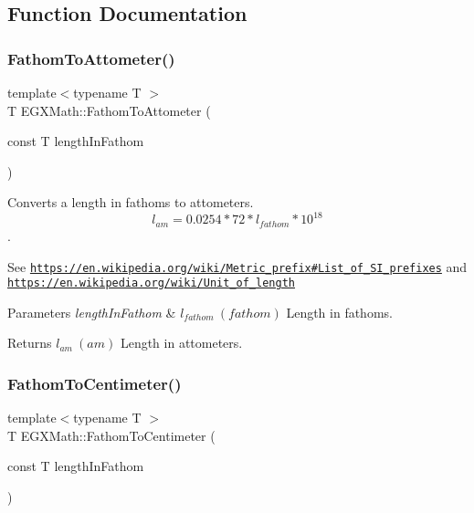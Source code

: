 \subsection{Function Documentation}
\mbox{\label{group___e_g_x_math-_conversions-_length_conversions-_nautical-_fathom-_s_i_ga9cc357e26a4f582c83487932d82e09cb}} 
\subsubsection{\texorpdfstring{Fathom\+To\+Attometer()}{FathomToAttometer()}}
{\footnotesize\ttfamily template$<$typename T $>$ \\
T E\+G\+X\+Math\+::\+Fathom\+To\+Attometer (\begin{DoxyParamCaption}\item[{const T}]{length\+In\+Fathom }\end{DoxyParamCaption})}



Converts a length in fathoms to attometers. \[ l_{am}=0.0254 * 72 * l_{fathom} * 10^{18} \]. 

See \href{https://en.wikipedia.org/wiki/Metric_prefix#List_of_SI_prefixes}{\tt https\+://en.\+wikipedia.\+org/wiki/\+Metric\+\_\+prefix\#\+List\+\_\+of\+\_\+\+S\+I\+\_\+prefixes} and \href{https://en.wikipedia.org/wiki/Unit_of_length}{\tt https\+://en.\+wikipedia.\+org/wiki/\+Unit\+\_\+of\+\_\+length} 
\begin{DoxyParams}{Parameters}
{\em length\+In\+Fathom} & $ l_{fathom}\ (fathom)$ Length in fathoms. \\
\hline
\end{DoxyParams}
\begin{DoxyReturn}{Returns}
$ l_{am}\ (am)$ Length in attometers. 
\end{DoxyReturn}
\mbox{\label{group___e_g_x_math-_conversions-_length_conversions-_nautical-_fathom-_s_i_ga3995ded9e8a94c2d7059dd148954b46c}} 
\subsubsection{\texorpdfstring{Fathom\+To\+Centimeter()}{FathomToCentimeter()}}
{\footnotesize\ttfamily template$<$typename T $>$ \\
T E\+G\+X\+Math\+::\+Fathom\+To\+Centimeter (\begin{DoxyParamCaption}\item[{const T}]{length\+In\+Fathom }\end{DoxyParamCaption})}



